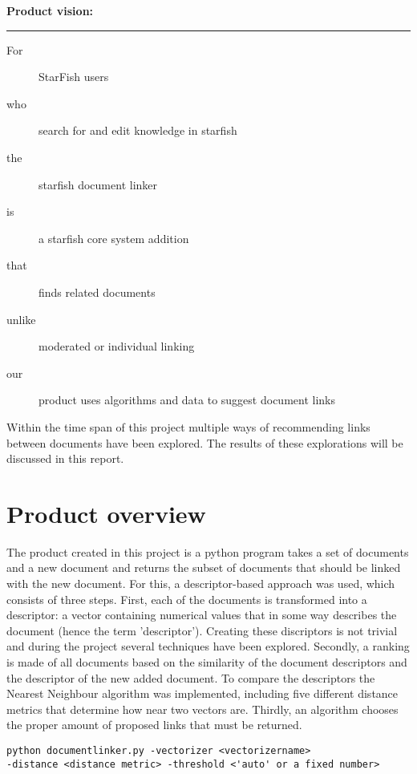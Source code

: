 \begin{shaded}
\textbf{{\large Product vision:}} \vspace{0.5\baselineskip} \hrule
	\begin{description}
 		\item[For] StarFish users
 		\item[who] search for and edit knowledge in starfish
 		\item[the] starfish document linker 
 		\item[is] a starfish core system addition
 		\item[that] finds related documents
 		\item[unlike] moderated or individual linking
 		\item[our] product uses algorithms and data to suggest document links 
	\end{description}
\end{shaded}


Within the time span of this project multiple ways of recommending links between documents have been explored. The results of these explorations will be discussed in this report. 

\section{Product overview}

The product created in this project is a python program takes a set of documents and a new document and returns the subset of documents that should be linked with the new document. For this, a descriptor-based approach was used, which consists of three steps. First, each of the documents is transformed into a descriptor: a vector containing numerical values that in some way describes the document (hence the term 'descriptor'). Creating these discriptors is not trivial and during the project several techniques have been explored. Secondly, a ranking is made of all documents based on the similarity of the document descriptors and the descriptor of the new added document. To compare the descriptors the Nearest Neighbour algorithm was implemented, including five different distance metrics that determine how near two vectors are. Thirdly, an algorithm chooses the proper amount of proposed links that must be returned.

\begin{lstlisting}
python documentlinker.py -vectorizer <vectorizername> 
-distance <distance metric> -threshold <'auto' or a fixed number>
\end{lstlisting}


